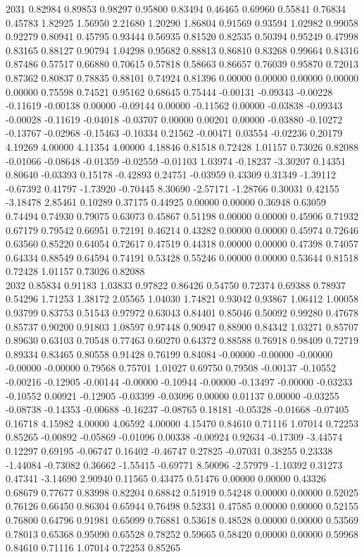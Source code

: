 {2031 0.82984 0.89853 0.98297 0.95800 0.83494 0.46465 0.69960 0.55841 0.76834 0.45783 1.82925 1.56950 2.21680 1.20290 1.86804 0.91569 0.93594 1.02982 0.99058 0.92279 0.80941 0.45795 0.93444 0.56935 0.81520 0.82535 0.50394 0.95249 0.47998 0.83165 0.88127 0.90794 1.04298 0.95682 0.88813 0.86810 0.83268 0.99664 0.84316 0.87486 0.57517 0.66880 0.70615 0.57818 0.58663 0.86657 0.76039 0.95870 0.72013 0.87362 0.80837 0.78835 0.88101 0.74924 0.81396 0.00000 0.00000 0.00000 0.00000 0.00000 0.75598 0.74521 0.95162 0.68645 0.75444 -0.00131 -0.09343 -0.00228 -0.11619 -0.00138 0.00000 -0.09144 0.00000 -0.11562 0.00000 -0.03838 -0.09343 -0.00028 -0.11619 -0.04018 -0.03707 0.00000 0.00201 0.00000 -0.03880 -0.10272 -0.13767 -0.02968 -0.15463 -0.10334 0.21562 -0.00471 0.03554 -0.02236 0.20179 4.19269 4.00000 4.11354 4.00000 4.18846 0.81518 0.72428 1.01157 0.73026 0.82088 -0.01066 -0.08648 -0.01359 -0.02559 -0.01103 1.03974 -0.18237 -3.30207 0.14351 0.80640 -0.03393 0.15178 -0.42893 0.24751 -0.03959 0.43309 0.31349 -1.39112 -0.67392 0.41797 -1.73920 -0.70445 8.30690 -2.57171 -1.28766 0.30031 0.42155 -3.18478 2.85461 0.10289 0.37175 0.44925 0.00000 0.00000 0.36948 0.63059 0.74494 0.74930 0.79075 0.63073 0.45867 0.51198 0.00000 0.00000 0.45906 0.71932 0.67179 0.79542 0.66951 0.72191 0.46214 0.43282 0.00000 0.00000 0.45974 0.72646 0.63560 0.85220 0.64054 0.72617 0.47519 0.44318 0.00000 0.00000 0.47398 0.74057 0.64334 0.88549 0.64594 0.74191 0.53428 0.55246 0.00000 0.00000 0.53644 0.81518 0.72428 1.01157 0.73026 0.82088 \\
2032 0.85834 0.91183 1.03833 0.97822 0.86426 0.54750 0.72374 0.69388 0.78937 0.54296 1.71253 1.38172 2.05565 1.04030 1.74821 0.93042 0.93867 1.06412 1.00058 0.93799 0.83753 0.51543 0.97972 0.63043 0.84401 0.85046 0.50092 0.99280 0.47678 0.85737 0.90200 0.91803 1.08597 0.97448 0.90947 0.88900 0.84342 1.03271 0.85707 0.89630 0.63103 0.70548 0.77463 0.60270 0.64372 0.88588 0.76918 0.98409 0.72719 0.89334 0.83465 0.80558 0.91428 0.76199 0.84084 -0.00000 -0.00000 -0.00000 -0.00000 -0.00000 0.79568 0.75701 1.01027 0.69750 0.79508 -0.00137 -0.10552 -0.00216 -0.12905 -0.00144 -0.00000 -0.10944 -0.00000 -0.13497 -0.00000 -0.03233 -0.10552 0.00921 -0.12905 -0.03399 -0.03096 0.00000 0.01137 0.00000 -0.03255 -0.08738 -0.14353 -0.00688 -0.16237 -0.08765 0.18181 -0.05328 -0.01668 -0.07405 0.16718 4.15982 4.00000 4.06592 4.00000 4.15470 0.84610 0.71116 1.07014 0.72253 0.85265 -0.00892 -0.05869 -0.01096 0.00338 -0.00924 0.92634 -0.17309 -3.44574 0.12297 0.69195 -0.06747 0.16402 -0.46747 0.27825 -0.07031 0.38255 0.23338 -1.44084 -0.73082 0.36662 -1.55415 -0.69771 8.50096 -2.57979 -1.10392 0.31273 0.47341 -3.14690 2.90940 0.11565 0.43475 0.51476 0.00000 0.00000 0.43326 0.68679 0.77677 0.83998 0.82204 0.68842 0.51919 0.54248 0.00000 0.00000 0.52025 0.76126 0.66450 0.86304 0.65944 0.76498 0.52331 0.47585 0.00000 0.00000 0.52155 0.76800 0.64796 0.91981 0.65099 0.76881 0.53618 0.48528 0.00000 0.00000 0.53569 0.78013 0.65368 0.95090 0.65528 0.78252 0.59665 0.58420 0.00000 0.00000 0.59968 0.84610 0.71116 1.07014 0.72253 0.85265 \\
}
